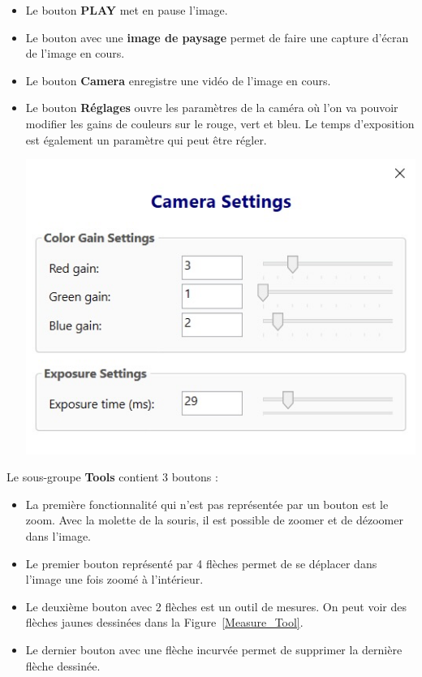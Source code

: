 \begin{itemize}[label=\textbullet]
    \item Le bouton \textbf{PLAY} met en pause l'image.
    \item Le bouton avec une \textbf{image de paysage} permet de faire une capture d'écran de l'image en cours.
    \item Le bouton \textbf{Camera} enregistre une vidéo de l'image en cours.
    \item
          \begin{minipage}{0.4\textwidth}
              Le bouton \textbf{Réglages} ouvre les paramètres de la caméra où l'on va pouvoir modifier les gains de couleurs sur le rouge, vert et bleu. Le temps d'exposition est également un paramètre qui peut être régler.
          \end{minipage}
          \hfill
          \begin{minipage}{0.55\textwidth}
              \centering
              \includegraphics[width=\textwidth]{assets/figures/Application_ServoVision/Settings_Camera.png}
              \label{Settings_Camera}
          \end{minipage}
\end{itemize}
Le sous-groupe \textbf{Tools} contient 3 boutons :
\begin{itemize}[label=\textbullet]
    \item La première fonctionnalité qui n'est pas représentée par un bouton est le zoom. Avec la molette de la souris, il est possible de zoomer et de dézoomer dans l'image.
    \item Le premier bouton représenté par 4 flèches permet de se déplacer dans l'image une fois zoomé à l'intérieur.
    \item Le deuxième bouton avec 2 flèches est un outil de mesures. On peut voir des flèches jaunes dessinées dans la Figure~\ref{Measure_Tool}.
    \item Le dernier bouton avec une flèche incurvée permet de supprimer la dernière flèche dessinée.
\end{itemize}

